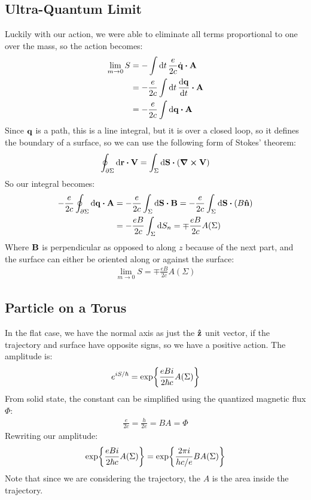 \documentclass[12pt]{article}
\newcommand{\q}{\vb{q}}
\begin{document}
\subsection{Ultra-Quantum Limit}
Luckily with our action, we were able to eliminate all terms proportional to one over the mass, so the action becomes:
\begin{align*}
  \lim_{m\to0}S&=-\int\dd{t}\frac{e}{2c}\dot{\q}\vdot\vb{A}\\
  &=-\frac{e}{2c}\int\dd{t}\dv{\q}{t}\vdot\vb{A}\\
  &=-\frac{e}{2c}\int\dd{\q}\vdot\vb{A}
\end{align*}
Since $\q$ is a path, this is a line integral, but it is over a closed loop, so it defines the boundary of a surface, so we can use the following form of Stokes' theorem:
\begin{align*}
  \oint_{\partial\Sigma}\dd{\vb{r}}\vdot\vb{V}=
  \int_\Sigma\dd{\vb{S}}\vdot\qty(\curl{\vb{V}})
\end{align*}
So our integral becomes:
\begin{align*}
  -\frac{e}{2c}\oint_{\partial\Sigma}\dd{\q}\vdot\vb{A}
  &=-\frac{e}{2c}\int_\Sigma\dd{\vb{S}}\vdot\vb{B}
  =-\frac{e}{2c}\int_\Sigma\dd{\vb{S}}\vdot(B\vu{n})\\
  &=-\frac{eB}{2c}\int_\Sigma\dd{S_n}=\mp\frac{eB}{2c}A(\Sigma)
\end{align*}
Where $\vb{B}$ is perpendicular as opposed to along $z$ because of the next part, and the surface can either be oriented along or against the surface:
\begin{align*}
  \boxed{\lim_{m\to0}S=\mp\frac{eB}{2c}A(\Sigma)}
\end{align*}
\subsection{Particle on a Torus}
In the flat case, we have the normal axis as just the $\vu{z}$ unit vector, if the trajectory and surface have opposite signs, so we have a positive action. The amplitude is:
\begin{align*}
  e^{iS/\hbar}=\exp{\frac{eBi}{2\hbar c}A\qty(\Sigma)}
\end{align*}
From solid state, the constant can be simplified using the quantized magnetic flux $\Phi$:
\begin{align*}
  \frac{e}{2c}=\frac{h}{2e}=BA=\Phi
\end{align*}
Rewriting our amplitude:
\begin{align*}
  \exp{\frac{eBi}{2\hbar c}A\qty(\Sigma)}=\exp{\frac{2\pi i}{hc/e}B A(\Sigma)}
\end{align*}
Note that since we are considering the trajectory, the $A$ is the area inside the trajectory.
\end{document}
